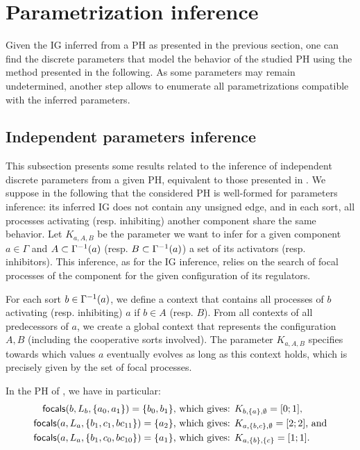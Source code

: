 \section{Parametrization inference}\label{sec:infer-K}

Given the IG inferred from a PH as presented in the previous section, one can find the discrete parameters that model the behavior of the studied PH using the method presented in the following.
As some parameters may remain undetermined, another step allows to enumerate all parametrizations compatible with the inferred parameters.

\subsection{Independent parameters inference}

This subsection presents some results related to the inference of independent discrete parameters from a given PH,
equivalent to those presented in \cite{PMR10-TCSB}.
We suppose in the following that the considered PH is well-formed for parameters inference: its inferred IG does not contain any unsigned edge,
and in each sort, all processes activating (resp. inhibiting) another component share the same behavior.
Let $K_{a,A,B}$ be the parameter we want to infer for a given component $a \in \Gamma$
and $A \subset \Gamma^{-1}(a)$ (resp. $B \subset \Gamma^{-1}(a)$) a set of its activators (resp. inhibitors).
This inference, as for the IG inference, relies on the search of focal processes of the component for the given configuration of its regulators.

For each sort $b \in \Gamma^{-1}(a)$, we define a context that contains all processes of $b$ activating (resp. inhibiting) $a$ if $b \in A$ (resp. $B$).
From all contexts of all predecessors of $a$, we create a global context that represents the configuration $A,B$ (including the cooperative sorts involved).
The parameter $K_{a,A,B}$ specifies towards which values $a$ eventually evolves as long as this context holds, which is precisely given by the set of focal processes.

\begin{example*}
In the PH of , we have in particular:
\begin{align*}
\mathsf{focals}(b,L_b,\{a_0, a_1\}) = \{b_0, b_1\} &\text{, which gives: } K_{b,\{a\},\emptyset} = [0 ; 1], \\
\mathsf{focals}(a,L_a,\{b_1, c_1, bc_{11}\}) = \{a_2\} &\text{, which gives: } K_{a,\{b,c\},\emptyset} = [2 ; 2] \text{, and} \\
\mathsf{focals}(a,L_a,\{b_1, c_0, bc_{10}\}) = \{a_1\} &\text{, which gives: } K_{a,\{b\},\{c\}} = [1;1].
\end{align*}
\end{example*}

